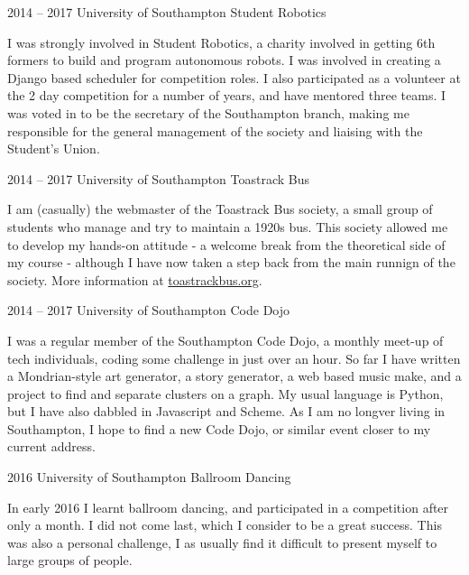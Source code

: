 \documentclass{tccv}
\begin{document}
\begin{eventlist}

    \item{2014 -- 2017}
         {University of Southampton}
         {Student Robotics}

    I was strongly involved in Student Robotics, a charity involved in getting 6th formers to build and program autonomous robots. I was involved in creating a Django based scheduler for competition roles. I also participated as a volunteer at the 2 day competition for a number of years, and have mentored three teams. I was voted in to be the secretary of the Southampton branch, making me responsible for the general management of the society and liaising with the Student's Union.

    \item{2014 -- 2017}
         {University of Southampton}
         {Toastrack Bus}

    I am (casually) the webmaster of the Toastrack Bus society, a small group of students who manage and try to maintain a 1920s bus. This society allowed me to develop my hands-on attitude - a welcome break from the theoretical side of my course - although I have now taken a step back from the main runnign of the society. More information at \href{http://toastrackbus.org}{toastrackbus.org}.

    \item{2014 -- 2017}
         {University of Southampton}
         {Code Dojo}

    I was a regular member of the Southampton Code Dojo, a monthly meet-up of tech individuals, coding some challenge in just over an hour. So far I have written a Mondrian-style art generator, a story generator, a web based music make, and a project to find and separate clusters on a graph. My usual language is Python, but I have also dabbled in Javascript and Scheme. As I am no longver living in Southampton, I hope to find a new Code Dojo, or similar event closer to my current address.

    \item{2016}
         {University of Southampton}
         {Ballroom Dancing}

    In early 2016 I learnt ballroom dancing, and participated in a competition after only a month. I did not come last, which I consider to be a great success. This was also a personal challenge, I as usually find it difficult to present myself to large groups of people.\newline\newline\newline\newline\newline



\end{eventlist}
\end{document}
